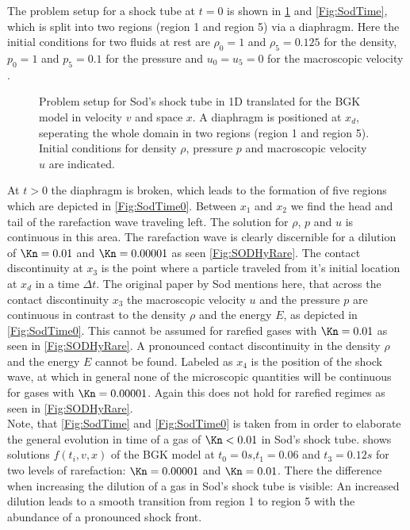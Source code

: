 The problem setup for a shock tube at \(t=0\) is shown in \cref{Fig:SodProbSetup} and \cref{Fig:SodTime}, which is split into two regions (region 1 and region 5) via a diaphragm. Here the initial conditions for two fluids at rest are \(\rho_0 = 1\) and \(\rho_5=0.125\) for the density, \(p_0=1\) and \(p_5=0.1\) for the pressure and \(u_0=u_5=0\) for the macroscopic velocity \cite{Sod}.
\begin{figure}[H]
	\centering
	
	\caption{Problem setup for Sod's shock tube in 1D translated for the BGK model in velocity \(v\) and space \(x\). A diaphragm is positioned at \(x_d\), seperating the whole domain in two regions (region 1 and region 5). Initial conditions for density \(\rho\), pressure \(p\) and macroscopic velocity \(u\) are indicated.}
	\label{Fig:SodProbSetup}
\end{figure}
At \(t>0\) the diaphragm is broken, which leads to the formation of five regions which are depicted in \cref{Fig:SodTime0}. Between \(x_1\) and \(x_2\) we find the head and tail of the rarefaction wave traveling left. The solution for \(\rho\), \(p\) and \(u\) is continuous in this area. The rarefaction wave is clearly discernible for a dilution of \(\Kn=0.01\) and \(\Kn=0.00001\) as seen \cref{Fig:SODHyRare}. The contact discontinuity at \(x_3\) is the point where a particle traveled from it's initial location at \(x_d\) in a time \(\Delta t\). The original paper by Sod mentions here, that across the contact discontinuity \(x_3\) the macroscopic velocity \(u\) and the pressure \(p\) are continuous in  contrast to the density \(\rho\) and the energy \(E\), as depicted in \cref{Fig:SodTime0}. This cannot be assumed for rarefied gases with \(\Kn=0.01\) as seen in \cref{Fig:SODHyRare}. A pronounced contact discontinuity in the density \(\rho\) and the energy \(E\) cannot be found. Labeled as \(x_4\) is the position of the shock wave, at which in general none of the microscopic quantities will be continuous for gases with \(\Kn=0.00001\). Again this does not hold for rarefied regimes as seen in \cref{Fig:SODHyRare}.\\
Note, that \cref{Fig:SodTime} and \cref{Fig:SodTime0} is taken from \cite{Sod} in order to elaborate the general evolution in time of a gas of \(\Kn<0.01\) in Sod's shock tube.  shows solutions \(f(t_i,v,x)\) of the BGK model at \(t_0=0s\),\(t_1=0.06\) and \(t_3=0.12s\) for two levels of rarefaction: \(\Kn=0.00001\) and \(\Kn=0.01\). There the difference when increasing the dilution of a gas in Sod's shock tube is visible: An increased dilution leads to a smooth transition from region 1 to region 5 with the abundance of a pronounced shock front. 

